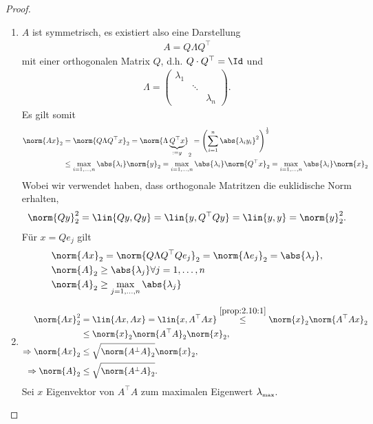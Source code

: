 \begin{proof}
\begin{enumerate}[label=Zu (\roman{*})]
\item $A$ ist symmetrisch, es existiert also eine
Darstellung
\begin{align*}
A=Q\Lambda Q^\top
\end{align*}
mit einer orthogonalen Matrix $Q$, d.h. $Q\cdot Q^\top= \Id$ und
\begin{align*}
\Lambda = \begin{pmatrix}
\lambda_1 & & \\
& \ddots & \\
&& \lambda_n
\end{pmatrix}.
\end{align*}
Es gilt somit
\begin{align*}
\norm{Ax}_2 &= \norm{Q\Lambda Q^\top x}_2 = \norm{\Lambda \underbrace{Q^\top
x}_{:=y}}_2
= \left(\sum\limits_{i=1}^n \abs{\lambda_i y_i}^2\right)^{\frac{1}{2}}\\ 
&\le \max\limits_{i=1,\ldots,n} \abs{\lambda_i} \norm{y}_2
= \max\limits_{i=1,\ldots,n} \abs{\lambda_i} \norm{Q^\top x}_2
= \max\limits_{i=1,\ldots,n} \abs{\lambda_i} \norm{x}_2
\end{align*}
Wobei wir verwendet haben, dass orthogonale Matritzen die euklidische Norm
erhalten,
\begin{align*}
\norm{Qy}_2^2 = \lin{Qy,Qy} = \lin{y,Q^\top Qy} = \lin{y,y} = \norm{y}_2^2.
\end{align*}
Für $x=Q e_j$ gilt
\begin{align*}
&\norm{Ax}_2 = \norm{Q\Lambda Q^\top Q e_j}_2 = \norm{\Lambda e_j}_2 =
\abs{\lambda_j},\\
&\norm{A}_2 \ge \abs{\lambda_j} \forall j=1,\ldots,n\\
&\norm{A}_2 \ge \max\limits_{j=1,\ldots,n} \abs{\lambda_j}
\end{align*}
\item 
\begin{align*}
\norm{Ax}_2^2 &= \lin{Ax,Ax} = \lin{x,A^\top Ax}
\overset{\ref{prop:2.10:1}}{\le} \norm{x}_2\norm{A^\top Ax}_2\\
&\le \norm{x}_2 \norm{A^\top A}_2\norm{x}_2,\\
\Rightarrow \norm{Ax}_2 &\le \sqrt{\norm{A^\bot A}_2}\norm{x}_2,\\
\Rightarrow \norm{A}_2 &\le \sqrt{\norm{A^\bot A}_2}.
\end{align*}
Sei $x$ Eigenvektor von $A^\top A$ zum maximalen Eigenwert
$\lambda_\text{\tiny max}$.

\end{enumerate}
\end{proof}
